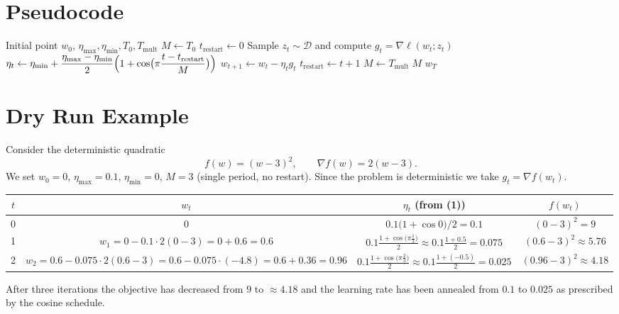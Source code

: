 \documentclass{article}
\begin{document}
\section*{Pseudocode}
\begin{algorithm}[H]
\caption{SGDR}
\begin{algorithmic}[1]
\Require Initial point $w_0$, $\eta_{\max},\eta_{\min},T_0,T_{\text{mult}}$
\State $M \gets T_0$ 
\State $t_{\text{restart}}\gets 0$ 
    \State Sample $z_t\sim\mathcal D$ and compute $g_t=\nabla\ell(w_t;z_t)$
    \State $\displaystyle \eta_t \gets \eta_{\min}+\frac{\eta_{\max}-\eta_{\min}}{2}
          \Bigl(1+\cos\bigl(\pi\frac{t-t_{\text{restart}}}{M}\bigr)\Bigr)$
    \State $w_{t+1}\gets w_t-\eta_t g_t$
        \State $t_{\text{restart}}\gets t+1$ 
        \State $M\gets T_{\text{mult}}\;M$ 
    \EndIf
\EndFor
\State \Return $w_T$
\end{algorithmic}
\end{algorithm}

\section*{Dry Run Example}
Consider the deterministic quadratic
\[
f(w)=(w-3)^2,\qquad \nabla f(w)=2(w-3).
\]
We set $w_0=0$, $\eta_{\max}=0.1$, $\eta_{\min}=0$, $M=3$ (single period, no restart).  
Since the problem is deterministic we take $g_t=\nabla f(w_t)$.

\begin{center}
\begin{tabular}{c|c|c|c}
$t$ & $w_t$ & $\eta_t$ (from (1)) & $f(w_t)$ \\ \hline
0 & $0$ & $0.1\bigl(1+\cos0\bigr)/2=0.1$ & $(0-3)^2=9$ \\
1 & $w_1=0-0.1\cdot2(0-3)=0+0.6=0.6$ &
$\displaystyle0.1\frac{1+\cos\!\bigl(\pi\frac{1}{3}\bigr)}{2}
\approx0.1\frac{1+0.5}{2}=0.075$ &
$(0.6-3)^2\approx5.76$ \\
2 & $w_2=0.6-0.075\cdot2(0.6-3)=0.6-0.075\cdot(-4.8)=0.6+0.36=0.96$ &
$\displaystyle0.1\frac{1+\cos\!\bigl(\pi\frac{2}{3}\bigr)}{2}
\approx0.1\frac{1+(-0.5)}{2}=0.025$ &
$(0.96-3)^2\approx4.18$
\end{tabular}
\end{center}
After three iterations the objective has decreased from $9$ to $\approx4.18$ and the learning rate has been annealed from $0.1$ to $0.025$ as prescribed by the cosine schedule.
\end{document}
